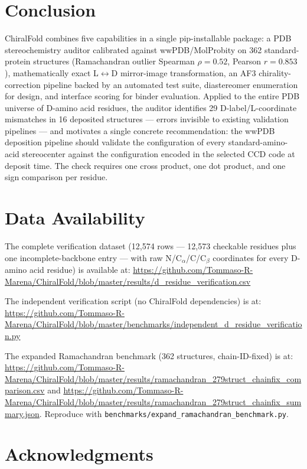 \documentclass[11pt]{article}
\begin{document}
\section{Conclusion}

ChiralFold combines five capabilities in a single pip-installable package: a PDB stereochemistry auditor calibrated against wwPDB/MolProbity on 362 standard-protein structures (Ramachandran outlier Spearman $\rho=0.52$, Pearson $r=0.853$), mathematically exact L$\leftrightarrow$D mirror-image transformation, an AF3 chirality-correction pipeline backed by an automated test suite, diastereomer enumeration for design, and interface scoring for binder evaluation. Applied to the entire PDB universe of D-amino acid residues, the auditor identifies 29 D-label/L-coordinate mismatches in 16 deposited structures --- errors invisible to existing validation pipelines --- and motivates a single concrete recommendation: the wwPDB deposition pipeline should validate the configuration of every standard-amino-acid stereocenter against the configuration encoded in the selected CCD code at deposit time. The check requires one cross product, one dot product, and one sign comparison per residue.

\section{Data Availability}

The complete verification dataset (12,574 rows --- 12,573 checkable residues plus one incomplete-backbone entry --- with raw N/C$_\alpha$/C/C$_\beta$ coordinates for every D-amino acid residue) is available at: \url{https://github.com/Tommaso-R-Marena/ChiralFold/blob/master/results/d_residue_verification.csv}

The independent verification script (no ChiralFold dependencies) is at: \url{https://github.com/Tommaso-R-Marena/ChiralFold/blob/master/benchmarks/independent_d_residue_verification.py}

The expanded Ramachandran benchmark (362 structures, chain-ID-fixed) is at: \url{https://github.com/Tommaso-R-Marena/ChiralFold/blob/master/results/ramachandran_279struct_chainfix_comparison.csv} and \url{https://github.com/Tommaso-R-Marena/ChiralFold/blob/master/results/ramachandran_279struct_chainfix_summary.json}. Reproduce with \texttt{benchmarks/expand\_ramachandran\_benchmark.py}.

\section*{Acknowledgments}
\end{document}
